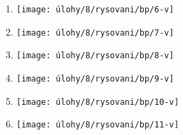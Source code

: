 \begin{enumerate}
\begin{minipage}[t]{\linewidth}
    \end{minipage}

    \item
    \begin{minipage}[t]{\linewidth}
        \begin{quote}
            \phantom{text}
        \end{quote}
        \centering
        \texttt{[image: úlohy/8/rysovani/bp/6-v]}

    \end{minipage}

    \item
    \begin{minipage}[t]{\linewidth}
        \begin{quote}
            \phantom{text}
        \end{quote}
        \centering
        \texttt{[image: úlohy/8/rysovani/bp/7-v]}

    \end{minipage}

    \item
    \begin{minipage}[t]{\linewidth}
        \begin{quote}
            \phantom{text}
        \end{quote}
        \centering
        \texttt{[image: úlohy/8/rysovani/bp/8-v]}

    \end{minipage}

    \item
    \begin{minipage}[t]{\linewidth}
        \begin{quote}
            \phantom{text}
        \end{quote}
        \centering
        \texttt{[image: úlohy/8/rysovani/bp/9-v]}

    \end{minipage}

    \item
    \begin{minipage}[t]{\linewidth}
        \begin{quote}
            \phantom{text}
        \end{quote}
        \centering
        \texttt{[image: úlohy/8/rysovani/bp/10-v]}

    \end{minipage}

    \item
    \begin{minipage}[t]{\linewidth}
        \begin{quote}
            \phantom{text}
        \end{quote}
        \centering
        \texttt{[image: úlohy/8/rysovani/bp/11-v]}

    \end{minipage}
\end{enumerate}


